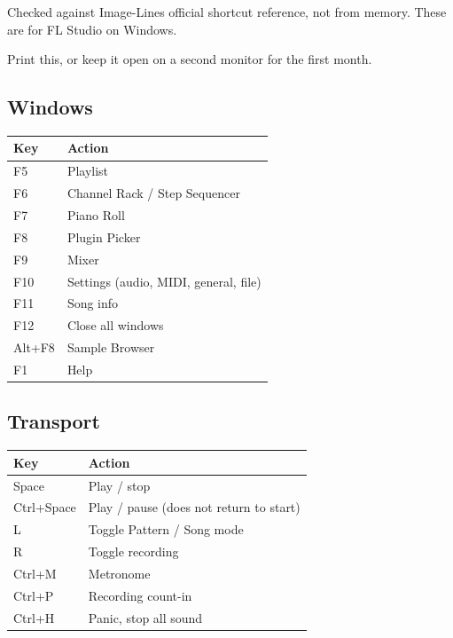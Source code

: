 Checked against Image-Line\textquotesingle s official shortcut reference, not from memory. These are for
FL Studio on Windows.

Print this, or keep it open on a second monitor for the first month.

\subsection{Windows}\label{fl04_shortcuts-windows}

{\def\LTcaptype{none} %
\begin{longtable}[]{@{}ll@{}}
\toprule\noalign{}
Key & Action \\
\midrule\noalign{}
\endhead
\bottomrule\noalign{}
\endlastfoot
F5 & Playlist \\
F6 & Channel Rack / Step Sequencer \\
F7 & Piano Roll \\
F8 & Plugin Picker \\
F9 & Mixer \\
F10 & Settings (audio, MIDI, general, file) \\
F11 & Song info \\
F12 & Close all windows \\
Alt+F8 & Sample Browser \\
F1 & Help \\
\end{longtable}
}

\subsection{Transport}\label{fl04_shortcuts-transport}

{\def\LTcaptype{none} %
\begin{longtable}[]{@{}ll@{}}
\toprule\noalign{}
Key & Action \\
\midrule\noalign{}
\endhead
\bottomrule\noalign{}
\endlastfoot
Space & Play / stop \\
Ctrl+Space & Play / pause (does not return to start) \\
L & Toggle Pattern / Song mode \\
R & Toggle recording \\
Ctrl+M & Metronome \\
Ctrl+P & Recording count-in \\
Ctrl+H & Panic, stop all sound \\
\end{longtable}
}


